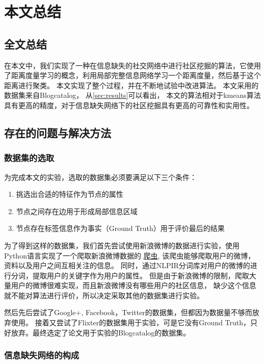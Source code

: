 \chapter{本文总结}
\label{chap:summary}

\section{全文总结}

在本文中，我们实现了一种在信息缺失的社交网络中进行社区挖掘的算法，它使用了距离度量学习的概念，利用局部完整信息网络学习一个距离度量，然后基于这个距离进行聚类。
本文实现了整个过程，并在不断地试验中改进算法。
本文采用的数据集来自Blogcatalog，
从\ref{sec:results}可以看出， 本文的算法相对于kmeans算法具有更高的精度，对于信息缺失网络下的社区挖掘具有更高的可靠性和实用性。

\section{存在的问题与解决方法}

\subsection{数据集的选取}

为完成本文的实验，选取的数据集必须要满足以下三个条件：

\begin{enumerate}
\item 挑选出合适的特征作为节点的属性
\item 节点之间存在边用于形成局部信息区域
\item 节点存在标签信息作为事实（Ground Truth）用于评价最后的结果
\end{enumerate}

为了得到这样的数据集，我们首先尝试使用新浪微博的数据进行实验，使用Python语言实现了一个爬取新浪微博数据的
\href{https://github.com/chouqin/weibo-crawler}{爬虫},
该爬虫能够爬取用户的微博，资料以及用户之间互相关注的信息。
同时，通过NLPIR分词库对用户的微博的进行分词，提取用户的关键字作为用户的属性。
但是由于新浪微博的限制，爬取大量用户的微博很难实现，而且新浪微博没有哪些用户的社区信息，
缺少这个信息就不能对算法进行评价，所以决定采取其他的数据集进行实验。

然后先后尝试了Google+, Facebook，Twitter的数据集，但都因为数据量不够而放弃使用。
接着又尝试了Flixter的数据集用于实验，可是它没有Ground Truth，只好放弃。最终选定了论文用于实验的Blogcatalog的数据集。

\subsection{信息缺失网络的构成}

